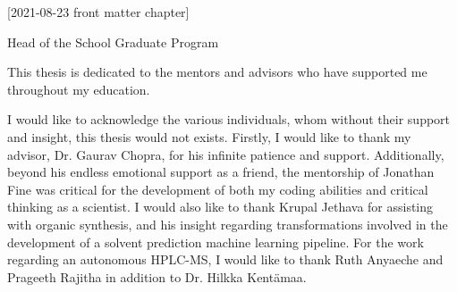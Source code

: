 [2021-08-23 front matter chapter]
%
%
%
%
%
%

%
%
%
\begin{statement}
     Head of the School Graduate Program\\
\end{statement}

\begin{dedication}
  This thesis is dedicated to the mentors and advisors who have supported me
  throughout my education.
\end{dedication}

\begin{acknowledgments}
  I would like to acknowledge the various individuals, whom without their support and insight, this thesis would not exists.  
  Firstly, I would like to thank my advisor, Dr. Gaurav Chopra, for his infinite patience and support.  Additionally, beyond his endless emotional support as a friend, the mentorship of Jonathan Fine was critical for the development of both my coding abilities and critical thinking as a scientist.  I would also like to thank Krupal Jethava for assisting with organic synthesis, and his insight regarding transformations involved in the development of a solvent prediction machine learning pipeline. For the work regarding an autonomous HPLC-MS, I would like to thank Ruth Anyaeche and Prageeth Rajitha in addition to Dr. Hilkka Kentämaa. 
\end{acknowledgments}

